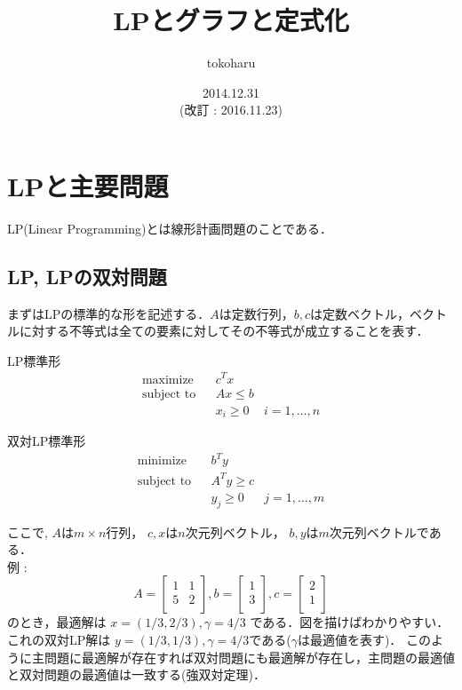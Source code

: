 \documentclass[13pt]{jarticle}
\title{LPとグラフと定式化}
\author{tokoharu}
\date {2014.12.31 \\ (改訂 : 2016.11.23)}
\theoremstyle{nonitalic} %
\begin{document}
\maketitle

\section{LPと主要問題}
LP(Linear Programming)とは線形計画問題のことである．
\subsection {LP, LPの双対問題}
まずはLPの標準的な形を記述する．$A$は定数行列，$b, c$は定数ベクトル，ベクトルに対する不等式は全ての要素に対してその不等式が成立することを表す．

LP標準形
\begin{align}
 &&&&&\textrm{maximize}   && c^Tx \\
 &&&&&\textrm{subject to} && Ax \leq b  &&&&&\\
 &&&&&                    && x_i \geq 0 & i = 1,\dots,n &&&&&
\end{align}

双対LP標準形
\begin{align}
 &&&&&\textrm{minimize}   && b^Ty \\
 &&&&&\textrm{subject to} && A^T y \geq c  &&&&&\\
 &&&&&                    && y_j \geq 0 & j = 1,\dots,m &&&&&
\end{align}

 
ここで, $A$は$m\times n$行列， 
$c,x$は$n$次元列ベクトル， 
$b,y$は$m$次元列ベクトルである． \\

例 : 
\begin{equation*}
 A = 
 \left[\begin{array}{cc}
  1 & 1 \\
  5 & 2 \\
 \end{array}\right],
 b = 
 \left[\begin{array}{c}
     1 \\
     3 \\
   \end{array}\right],
 c = 
 \left[\begin{array}{c}
     2 \\
     1 \\
 \end{array}\right]
\end{equation*}
のとき，最適解は $x = (1/3, 2/3) , \gamma = 4/3  $ である．図を描けばわかりやすい．これの双対LP解は
$y = (1/3, 1/3), \gamma = 4/3$である($\gamma$は最適値を表す)．
このように主問題に最適解が存在すれば双対問題にも最適解が存在し，主問題の最適値と双対問題の最適値は一致する(強双対定理)．
\end{document}
